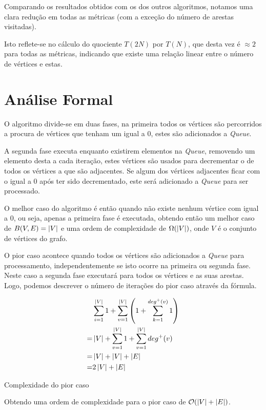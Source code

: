 Comparando os resultados obtidos com os dos outros algoritmos, notamos uma clara
redução em todas as métricas (com a exceção do número de arestas visitadas).

Isto reflete-se no cálculo do quociente $T(2N)$ por $T(N)$, que desta vez é
$\approx 2$ para todas as métricas, indicando que existe uma relação linear
entre o número de vértices e estas.

\section{Análise Formal}

O algoritmo divide-se em duas fases, na primeira todos os vértices são
percorridos a procura de vértices que tenham um  igual a 0,
estes são adicionados a \textit{Queue}.

A segunda fase executa enquanto existirem elementos na \textit{Queue}, removendo
um elemento desta a cada iteração, estes vértices são usados para decrementar o
 de todos os vértices a que são adjacentes. Se algum dos
vértices adjacentes ficar com o  igual a 0 após ter sido
decrementado, este será adicionado a \textit{Queue} para ser processado.

O melhor caso do algoritmo é então quando não existe nenhum vértice com
 igual a 0, ou seja, apenas a primeira fase é executada,
obtendo então um melhor caso de $B(V, E) = \left\lvert V \right\rvert$ e uma ordem de
complexidade de $\Omega(\left\lvert V \right\rvert)$, onde $V$ é o conjunto de vértices do
grafo.

O pior caso acontece quando todos os vértices são adicionados a \textit{Queue}
para processamento, independentemente se isto ocorre na primeira ou segunda
fase. Neste caso a segunda fase executará para todos os vértices e as suas
arestas. Logo, podemos descrever o número de iterações do pior caso através
da fórmula.

\begin{formula}[H]
	\begin{align}
		  & \sum_{i = 1}^{\left\lvert V \right\rvert} 1  + \sum_{v=1}^{\left\lvert V \right\rvert} \left(
		1 + \sum_{k=1}^{deg^+(v)} 1
		\right)                                                       \\
		= & \left\lvert V \right\rvert  + \sum_{v=1}^{\left\lvert V \right\rvert} 1
		+ \sum_{v=1}^{\left\lvert V \right\rvert} deg^+(v)                              \\
		= & \left\lvert V \right\rvert  + \left\lvert V \right\rvert + \left\lvert E \right\rvert                           \\
		= & 2 \left\lvert V \right\rvert + \left\lvert E \right\rvert
	\end{align}
	\caption{Complexidade do pior caso}
\end{formula}

Obtendo uma ordem de complexidade para o pior caso de
$\mathcal{O}(\left\lvert V \right\rvert + \left\lvert E \right\rvert)$.

